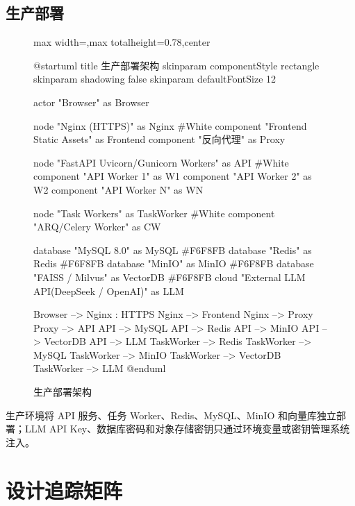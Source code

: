 \documentclass[a4paper,zihao=-4]{ctexart}
\begin{document}
\hypertarget{ux751fux4ea7ux90e8ux7f72}{%
\subsection{生产部署}\label{ux751fux4ea7ux90e8ux7f72}}

\begin{figure}[H]
\centering
\begin{adjustbox}{max width=\linewidth,max totalheight=0.78\textheight,center}
\begingroup
\renewcommand{\PlantUMLJobname}{plantuml-diagrams/req-uml-13}
\begin{plantuml}
@startuml
title 生产部署架构
skinparam componentStyle rectangle
skinparam shadowing false
skinparam defaultFontSize 12

actor "Browser" as Browser

node "Nginx (HTTPS)" as Nginx #White {
  component "Frontend Static Assets" as Frontend
  component "反向代理" as Proxy
}

node "FastAPI Uvicorn/Gunicorn Workers" as API #White {
  component "API Worker 1" as W1
  component "API Worker 2" as W2
  component "API Worker N" as WN
}

node "Task Workers" as TaskWorker #White {
  component "ARQ/Celery Worker" as CW
}

database "MySQL 8.0" as MySQL #F6F8FB
database "Redis" as Redis #F6F8FB
database "MinIO" as MinIO #F6F8FB
database "FAISS / Milvus" as VectorDB #F6F8FB
cloud "External LLM API\n(DeepSeek / OpenAI)" as LLM

Browser --> Nginx : HTTPS
Nginx --> Frontend
Nginx --> Proxy
Proxy --> API
API --> MySQL
API --> Redis
API --> MinIO
API --> VectorDB
API --> LLM
TaskWorker --> Redis
TaskWorker --> MySQL
TaskWorker --> MinIO
TaskWorker --> VectorDB
TaskWorker --> LLM
@enduml
\end{plantuml}
\endgroup
\end{adjustbox}
\caption{生产部署架构}
\end{figure}

生产环境将 API 服务、任务 Worker、Redis、MySQL、MinIO
和向量库独立部署；LLM API
Key、数据库密码和对象存储密钥只通过环境变量或密钥管理系统注入。

\hypertarget{ux8bbeux8ba1ux8ffdux8e2aux77e9ux9635}{%
\section{设计追踪矩阵}\label{ux8bbeux8ba1ux8ffdux8e2aux77e9ux9635}}
\end{document}
